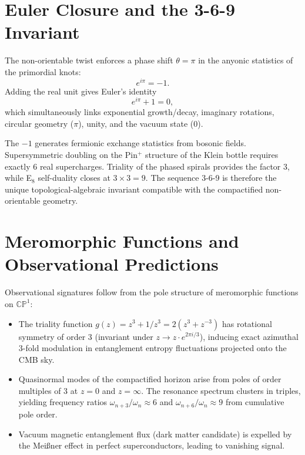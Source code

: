 \documentclass[11pt,a4paper]{article}
\begin{document}
\section{Euler Closure and the 3-6-9 Invariant}

The non-orientable twist enforces a phase shift $\theta = \pi$ in the anyonic statistics of the primordial knots:
\begin{equation}
e^{i\pi} = -1.
\end{equation}
Adding the real unit gives Euler's identity
\begin{equation}
e^{i\pi} + 1 = 0,
\end{equation}
which simultaneously links exponential growth/decay, imaginary rotations, circular geometry ($\pi$), unity, and the vacuum state (0).

The $-1$ generates fermionic exchange statistics from bosonic fields. Supersymmetric doubling on the Pin$^+$ structure of the Klein bottle requires exactly 6 real supercharges. Triality of the phased spirals provides the factor 3, while E$_8$ self-duality closes at $3 \times 3 = 9$. The sequence 3-6-9 is therefore the unique topological-algebraic invariant compatible with the compactified non-orientable geometry.

\section{Meromorphic Functions and Observational Predictions}

Observational signatures follow from the pole structure of meromorphic functions on $\mathbb{CP}^1$:

\begin{itemize}
\item The triality function $g(z) = z^3 + 1/z^3 = 2(z^3 + z^{-3})$ has rotational symmetry of order 3 (invariant under $z \to z \cdot e^{2\pi i / 3}$), inducing exact azimuthal 3-fold modulation in entanglement entropy fluctuations projected onto the CMB sky.
\item Quasinormal modes of the compactified horizon arise from poles of order multiples of 3 at $z=0$ and $z=\infty$. The resonance spectrum clusters in triples, yielding frequency ratios $\omega_{n+3}/\omega_n \approx 6$ and $\omega_{n+6}/\omega_n \approx 9$ from cumulative pole order.
\item Vacuum magnetic entanglement flux (dark matter candidate) is expelled by the Meißner effect in perfect superconductors, leading to vanishing signal.
\end{itemize}
\end{document}
